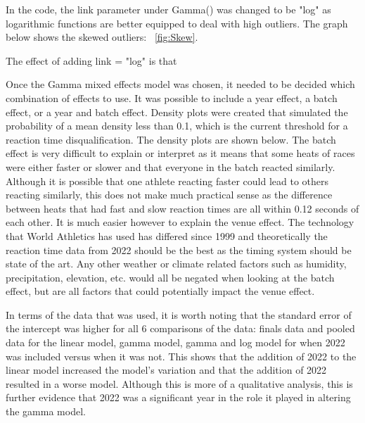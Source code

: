 \documentclass[12pt, letterpaper, titlepage]{article}
\begin{document}
In the code, the 
link parameter under Gamma() was changed to be "log" as logarithmic functions are better 
equipped to deal with high outliers.  The graph below shows the skewed outliers: ~\ref{fig:Skew}.


The effect of adding link = "log" is that


Once the Gamma mixed effects model was chosen, it needed to be decided which combination
of effects to use.  It was possible to include a year effect, a batch effect, or a year
and batch effect.  Density plots were created that simulated the probability of a mean
density less than 0.1, which is the current threshold for a reaction time
disqualification.  The density plots are shown below.  The batch effect is very
difficult to explain or interpret as it means that some heats of races were either
faster or slower and that everyone in the batch reacted similarly.  Although
it is possible that one athlete reacting faster could lead to others reacting
similarly, this does not make much practical sense as the difference between
heats that had fast and slow reaction times are all within 0.12 seconds of each
other.  It is much easier however to explain the venue effect.  The technology
that World Athletics has used has differed since 1999 and theoretically the
reaction time data from 2022 should be the best as the timing system should be
state of the art.  Any other weather or climate related factors such as humidity,
precipitation, elevation, etc. would all be negated when looking at the batch
effect, but are all factors that could potentially impact the venue effect.  

In terms of the data that was used, it is worth noting that the standard error
of the intercept was higher for all 6 comparisons of the data: finals data and 
pooled data for the linear model, gamma model, gamma and log model for when
2022 was included versus when it was not.  This shows that the addition
of 2022 to the linear model increased the model's variation and that the addition
of 2022 resulted in a worse model.  Although this is more of a qualitative analysis,
this is further evidence that 2022 was a significant year in the role it played
in altering the gamma model.
\end{document}
